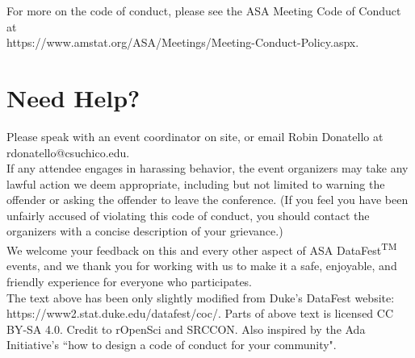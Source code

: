 \documentclass{article}
\begin{document}
For more on the code of conduct, please see the ASA Meeting Code of Conduct at \\
https://www.amstat.org/ASA/Meetings/Meeting-Conduct-Policy.aspx.

\section*{Need Help?}

Please speak with an event coordinator on site, or email Robin Donatello at rdonatello@csuchico.edu.\\

If any attendee engages in harassing behavior, the event organizers may take any lawful action we deem appropriate, including but not limited to warning the offender or asking the offender to leave the conference. (If you feel you have been unfairly accused of violating this code of conduct, you should contact the organizers with a concise description of your grievance.)\\

We welcome your feedback on this and every other aspect of ASA DataFest\textsuperscript{TM} events, and we thank you for working with us to make it a safe, enjoyable, and friendly experience for everyone who participates.\\

{\footnotesize{The text above has been only slightly modified from Duke's DataFest website: https://www2.stat.duke.edu/datafest/coc/. Parts of above text is licensed CC BY-SA 4.0. Credit to rOpenSci and SRCCON. Also inspired by the Ada Initiative's ``how to design a code of conduct for your community".}}
\end{document}
